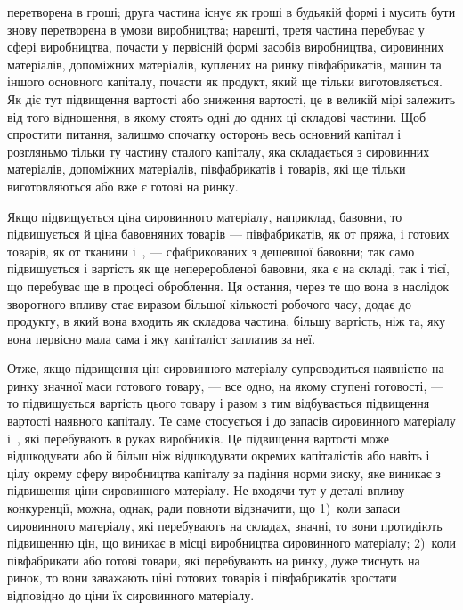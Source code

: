\parcont{}  %
перетворена в гроші; друга частина існує як гроші в будьякій
формі і мусить бути знову перетворена в умови виробництва;
нарешті, третя частина перебуває у сфері виробництва, почасти
у первісній формі засобів виробництва, сировинних матеріалів,
допоміжних матеріалів, куплених на ринку півфабрикатів,
машин та іншого основного капіталу, почасти як продукт, який
ще тільки виготовляється. Як діє тут підвищення вартості або
зниження вартості, це в великій мірі залежить від того відношення,
в якому стоять одні до одних ці складові частини. Щоб
спростити питання, залишмо спочатку осторонь весь основний
капітал і розгляньмо тільки ту частину сталого капіталу, яка
складається з сировинних матеріалів, допоміжних матеріалів,
півфабрикатів і товарів, які ще тільки виготовляються або вже
є готові на ринку.

Якщо підвищується ціна сировинного матеріалу, наприклад,
бавовни, то підвищується й ціна бавовняних товарів — півфабрикатів,
як от пряжа, і готових товарів, як от тканини і~, —
сфабрикованих з дешевшої бавовни; так само підвищується
і вартість як ще непереробленої бавовни, яка є на складі, так
і тієї, що перебуває ще в процесі оброблення. Ця остання,
через те що вона в наслідок зворотного впливу стає виразом
більшої кількості робочого часу, додає до продукту, в який
вона входить як складова частина, більшу вартість, ніж та, яку
вона первісно мала сама і яку капіталіст заплатив за неї.

Отже, якщо підвищення цін сировинного матеріалу супроводиться
наявністю на ринку значної маси готового товару, —
все одно, на якому ступені готовості, — то підвищується вартість
цього товару і разом з тим відбувається підвищення вартості
наявного капіталу. Те саме стосується і до запасів сировинного
матеріалу і~, які перебувають в руках виробників.
Це підвищення вартості може відшкодувати або й більш ніж
відшкодувати окремих капіталістів або навіть і цілу окрему
сферу виробництва капіталу за падіння норми зиску, яке виникає
з підвищення ціни сировинного матеріалу. Не входячи тут
у деталі впливу конкуренції, можна, однак, ради повноти відзначити,
що 1)~коли запаси сировинного матеріалу, які перебувають
на складах, значні, то вони протидіють підвищенню цін,
що виникає в місці виробництва сировинного матеріалу; 2)~коли
півфабрикати або готові товари, які перебувають на ринку, дуже
тиснуть на ринок, то вони заважають ціні готових товарів і півфабрикатів
зростати відповідно до ціни їх сировинного матеріалу.

